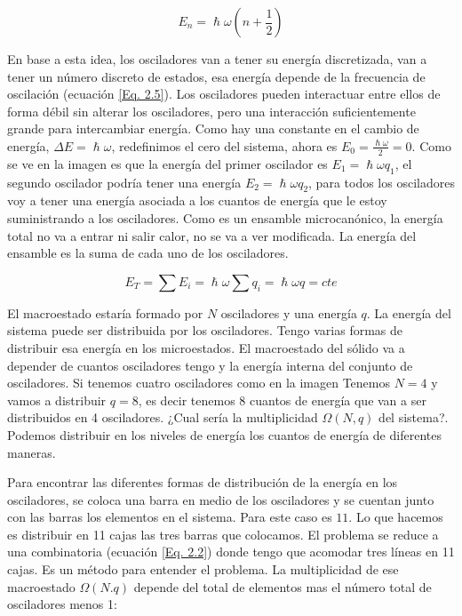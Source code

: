 \documentclass[11pt,fleqn]{book}
\begin{document}

\begin{equation}
    E_{n}=\hslash\omega\left(n+\frac{1}{2}\right)
    \label{Eq. 2.5}
\end{equation}

En base a esta idea, los osciladores van a tener su energía discretizada, van a tener un número discreto de estados, esa energía depende de la frecuencia de oscilación (ecuación \ref{Eq. 2.5}). Los osciladores pueden interactuar entre ellos de forma débil sin alterar los osciladores, pero una interacción suficientemente grande para intercambiar energía. Como hay una constante en el cambio de energía, $\Delta E=\hslash\omega$, redefinimos el cero del sistema, ahora es $E_{0}=\frac{\hslash\omega}{2}=0$. Como se ve en la imagen %
es que la energía del primer oscilador es $E_{1}=\hslash\omega q_{1}$, el segundo oscilador podría tener una energía $E_{2}=\hslash\omega q_{2}$, para todos los osciladores voy a tener una energía asociada a los cuantos de energía que le estoy suministrando a los osciladores. Como es un ensamble microcanónico, la energía total no va a entrar ni salir calor, no se va a ver modificada. La energía del ensamble es la suma de cada uno de los osciladores. 

\begin{equation}
    E_{T}=\sum E_{i}=\hslash\omega\sum q_{i}=\hslash\omega q=cte
    \label{Eq. 2.6}
\end{equation}

El macroestado estaría formado por $N$ osciladores y una energía $q$. La energía del sistema puede ser distribuida por los osciladores. Tengo varias formas de distribuir esa energía en los microestados. El macroestado del sólido va a depender de cuantos osciladores tengo y la energía interna del conjunto de osciladores. Si tenemos cuatro osciladores como en la imagen %
Tenemos $N=4$ y vamos a distribuir $q=8$, es decir tenemos 8 cuantos de energía que van a ser distribuidos en 4 osciladores. ¿Cual sería la multiplicidad $\Omega(N,q)$ del sistema?. Podemos distribuir en los niveles de energía los cuantos de energía de diferentes maneras.


Para encontrar las diferentes formas de distribución de la energía en los osciladores, se coloca una barra en medio de los osciladores y se cuentan junto con las barras los elementos en el sistema. Para este caso es $11$. Lo que hacemos es distribuir en 11 cajas las tres barras que colocamos. El problema se reduce a una combinatoria (ecuación \ref{Eq. 2.2}) donde tengo que acomodar tres líneas en 11 cajas. Es un método para entender el problema. La multiplicidad de ese macroestado $\Omega(N.q)$ depende del total de elementos mas el número total de osciladores menos 1:
\end{document}
